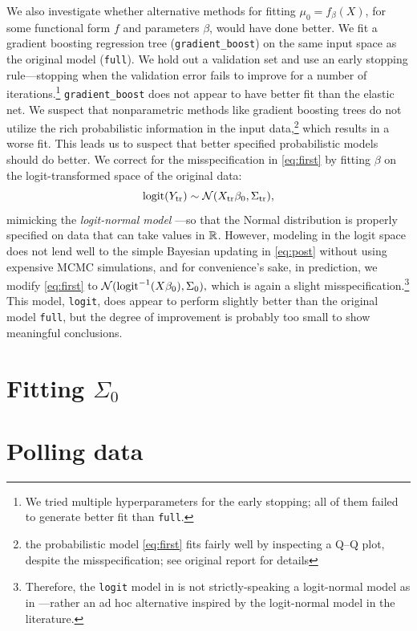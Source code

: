 \documentclass[12pt]{article}
\newcommand{\logit}{\operatorname{logit}}
\begin{document}
We also investigate whether alternative methods for fitting $\mu_0 =
f_\beta(X)$, for some functional form $f$ and parameters $\beta$, would have
done better. We fit a gradient boosting regression tree
(\texttt{gradient\_boost}) on the same input space as the original model
(\texttt{full}). We hold out a validation set and use an early stopping
rule---stopping when the validation error fails to improve for a number of
iterations.\footnote{We tried multiple hyperparameters for the early stopping;
all of them failed to generate better fit than \texttt{full}.}
\texttt{gradient\_boost} does not appear to have better fit than the elastic
net. We suspect that nonparametric methods like gradient boosting trees do not
utilize the rich probabilistic information in the input data,\footnote{the probabilistic
model \eqref{eq:first} fits fairly well by inspecting a Q--Q plot, despite the misspecification; see original
report for details} which results in a worse fit. This leads us to suspect that
better specified probabilistic models should do better. We correct for the
misspecification in \eqref{eq:first} by fitting $\beta$ on the logit-transformed
space of the original data: \[
\logit(Y_\text{tr}) \sim \Norm(X_\text{tr}\beta_0, \Sigma_\text{tr}),
\]
mimicking the \emph{logit-normal model} \cite[page 283]{agresti2015foundations}---so that the Normal distribution is properly specified on data that can take values in $\mathbb{R}$. However, modeling in the logit space does not lend well to the simple Bayesian updating in \eqref{eq:post} without using expensive MCMC simulations, and for convenience's sake, in prediction, we modify \eqref{eq:first} to $\Norm(\logit^{-1}(X\beta_0), \Sigma_0),$ which is again a slight misspecification.\footnote{Therefore, the \texttt{logit} model in  is not strictly-speaking a logit-normal model as in \cite{agresti2015foundations}---rather an ad hoc alternative inspired by the logit-normal model in the literature.} This model, \texttt{logit}, does appear to perform slightly better than the original model \texttt{full}, but the degree of improvement is probably too small to show meaningful conclusions.  

\section{Fitting $\Sigma_0$}
\label{sec:sigma}

\section{Polling data}
\label{sec:polling}
\end{document}
